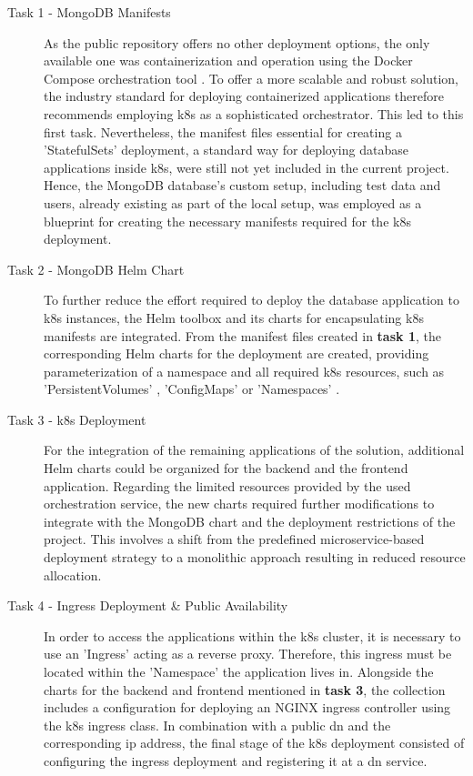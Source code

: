 \begin{description}
    \item[Task 1 - MongoDB Manifests] As the public repository offers no other deployment options, the only available one was containerization and operation using the Docker Compose orchestration tool \cite{noauthor_overview_2023}. 
    To offer a more scalable and robust solution, the industry standard for deploying containerized applications therefore recommends employing \acrshort{k8s} \cite{noauthor_produktionsreife_nodate} as a sophisticated orchestrator. This led to this first task. 
    Nevertheless, the manifest files essential for creating a 'StatefulSets' \cite{noauthor_statefulsets_nodate} deployment, a standard way for deploying database applications inside \acrshort{k8s}, were still not yet included in the current project. 
    Hence, the MongoDB \cite{noauthor_mongodb_nodate} database's custom setup, including test data and users, already existing as part of the local setup, was employed as a blueprint for creating the necessary manifests required for the \acrshort{k8s} deployment.
    \item[Task 2 - MongoDB Helm Chart] To further reduce the effort required to deploy the database application to \acrshort{k8s} instances, the Helm \cite{noauthor_helm_nodate} toolbox and its charts for encapsulating \acrshort{k8s} manifests are integrated.  
    From the manifest files created in \textbf{task 1}, the corresponding Helm charts for the deployment are created, providing parameterization of a namespace and all required \acrshort{k8s} resources, such as 'PersistentVolumes' \cite{noauthor_persistent_nodate}, 'ConfigMaps' \cite{noauthor_configmaps_nodate} or 'Namespaces' \cite{noauthor_namespaces_nodate}. 
    \item[Task 3 - \acrshort{k8s} Deployment] For the integration of the remaining applications of the solution, additional Helm charts could be organized for the backend and the frontend application. 
    Regarding the limited resources provided by the used orchestration service, the new charts required further modifications to integrate with the MongoDB chart and the deployment restrictions of the project. This involves a shift from the predefined microservice-based deployment strategy to a monolithic approach resulting in reduced resource allocation.
    \item[Task 4 - Ingress Deployment \& Public Availability] In order to access the applications within the \acrshort{k8s} cluster, it is necessary to use an 'Ingress' \cite{noauthor_ingress_nodate} acting as a reverse proxy. 
    Therefore, this ingress must be located within the 'Namespace' the application lives in.
    Alongside the charts for the backend and frontend mentioned in \textbf{task 3}, the collection includes a configuration for deploying an NGINX ingress controller \cite{noauthor_nginx_nodate} using the \acrshort{k8s} ingress class. 
    In combination with a public \acrshort{dn} and the corresponding \acrshort{ip} address, the final stage of the \acrshort{k8s} deployment consisted of configuring the ingress deployment and registering it at a \acrshort{dn} service.
\end{description}

